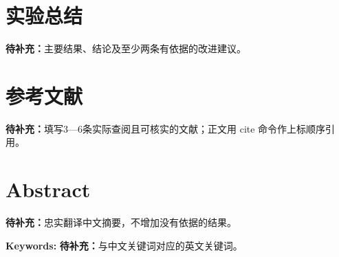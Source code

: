 \documentclass[UTF8,a4paper,11pt,fontset=fandol,scheme=plain]{ctexart}
\newcommand{\ReportTODO}[1]{\textbf{待补充：}#1}
\begin{document}
\section{实验总结}\label{sec:conclusion}
\ReportTODO{主要结果、结论及至少两条有依据的改进建议。}

\section{参考文献}
\ReportTODO{填写3—6条实际查阅且可核实的文献；正文用 cite 命令作上标顺序引用。}

\par\bigskip\noindent\begin{minipage}{\linewidth}
\section*{Abstract}
\ReportTODO{忠实翻译中文摘要，不增加没有依据的结果。}
\par\noindent\textbf{Keywords: }\ReportTODO{与中文关键词对应的英文关键词。}
\end{minipage}\par

\end{document}

